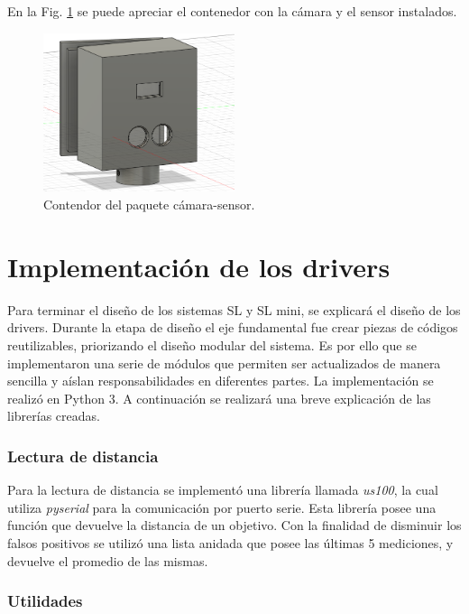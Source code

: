 En la Fig. \ref{fig:contenedor-camara-real} se puede apreciar el contenedor con la cámara y el sensor instalados.

\begin{figure}
    \centering
    \includegraphics[width=0.5\textwidth]{imgs/contenedor-camara.png}
    \caption{Contendor del paquete cámara-sensor.}
    \label{fig:contenedor-camara-real}
\end{figure}

\section{Implementación de los drivers}

Para terminar el diseño de los sistemas SL y SL mini, se explicará el diseño de los drivers. Durante la etapa de diseño el eje fundamental fue crear piezas de códigos reutilizables, priorizando el diseño modular del sistema.
Es por ello que se implementaron una serie de módulos que permiten ser actualizados de manera sencilla y aíslan responsabilidades en diferentes partes. La implementación se realizó en Python 3. A continuación se realizará una breve explicación de las librerías creadas.


\subsubsection*{Lectura de distancia}

Para la lectura de distancia se implementó una librería llamada \textit{us100}, la cual utiliza \textit{pyserial}  \cite{noauthor_documentacion_nodate-1} para la comunicación por puerto serie.
Esta librería posee una función que devuelve la distancia de un objetivo. Con la finalidad de disminuir los falsos positivos se utilizó una lista anidada que posee las últimas 5 mediciones, y devuelve el promedio de las mismas.

\subsubsection*{Utilidades}

